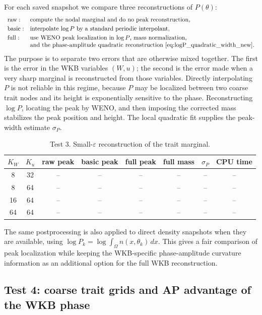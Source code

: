 \documentclass[11pt]{article}
\begin{document}
For each saved snapshot we compare three reconstructions of \(P(\theta)\):
\[
\begin{array}{ll}
{\rm raw:} & \hbox{compute the nodal marginal and do no peak reconstruction},\\[1mm]
{\rm basic:} & \hbox{interpolate \(\log P\) by a standard periodic interpolant},\\[1mm]
{\rm full:} & \hbox{use WENO peak localization in \(\log P\), mass normalization,}
              \\
              & \hbox{and the phase-amplitude quadratic reconstruction
              \eqref{eq:logP_quadratic_width_new}.}
\end{array}
\]
The purpose is to separate two errors that are otherwise mixed together.  The
first is the error in the WKB variables \((W,u)\); the second is the error made
when a very sharp marginal is reconstructed from those variables.  Directly
interpolating \(P\) is not reliable in this regime, because \(P\) may be
localized between two coarse trait nodes and its height is exponentially
sensitive to the phase.  Reconstructing \(\log P\), locating the peak by WENO,
and then imposing the corrected mass stabilizes the peak position and height.
The local quadratic fit supplies the peak-width estimate \(\sigma_P\).

\begin{table}[ht]
\centering
\caption{Test 3. Small-\(\varepsilon\) reconstruction of the trait marginal.}
\begin{tabular}{cccccccc}
\toprule
$K_W$ & $K_u$ & raw peak & basic peak & full peak & full mass & $\sigma_P$ & CPU time\\
\midrule
8 & 32 & -- & -- & -- & -- & -- & --\\
8 & 64 & -- & -- & -- & -- & -- & --\\
16 & 64 & -- & -- & -- & -- & -- & --\\
64 & 64 & -- & -- & -- & -- & -- & --\\
\bottomrule
\end{tabular}
\end{table}

The same postprocessing is also applied to direct density snapshots when they
are available, using \(\log P_k=\log\int_\Omega n(x,\theta_k)\,dx\).  This gives
a fair comparison of peak localization while keeping the WKB-specific
phase-amplitude curvature information as an additional option for the full WKB
reconstruction.

\subsection{Test 4: coarse trait grids and AP advantage of the WKB phase}\label{subsec:test_coarse_AP_new}
\end{document}

